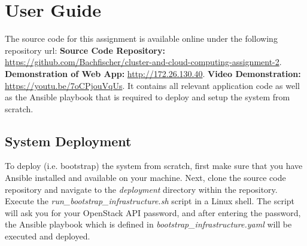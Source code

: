 \documentclass[11pt, oneside]{article}
\begin{document}
\section{User Guide}
\label{sec:user_guide}

The source code for this assignment is available online under the following repository \acrshort{url}: 
\newline
\newline
\textbf{Source Code Repository:}
\newline
\url{https://github.com/Bachfischer/cluster-and-cloud-computing-assignment-2}.
\newline
\newline
\textbf{Demonstration of Web App:}
\newline
\url{http://172.26.130.40}.
\newline
\newline
\textbf{Video Demonstration:}
\newline
\url{https://youtu.be/7oCPjouVqUs}.
\newline
\newline
It contains all relevant application code as well as the Ansible playbook that is required to deploy and setup the system from scratch.

\subsection{System Deployment}
To deploy (i.e. bootstrap) the  system from scratch, first make sure that you have Ansible installed and available on your machine. Next, clone the source code repository and navigate to the \emph{deployment} directory within the repository. 
\newline
Execute the \emph{run\_bootstrap\_infrastructure.sh} script in a Linux shell. The script will ask you for your OpenStack API password, and after entering the password, the Ansible playbook which is defined in \emph{bootstrap\_infrastructure.yaml} will be executed and deployed.
\end{document}

